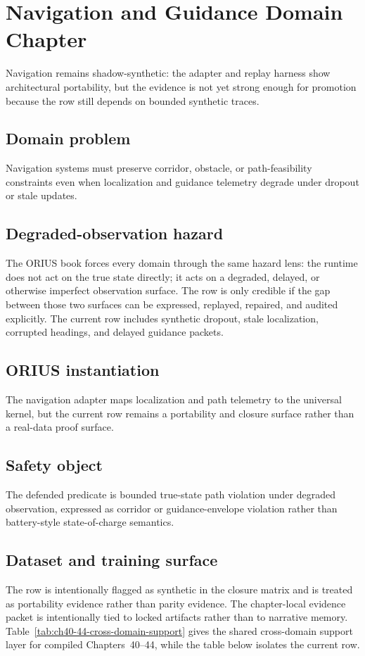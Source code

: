 \chapter{Navigation and Guidance Domain Chapter}
\label{ch:domain-navigation}

Navigation remains shadow-synthetic: the adapter and replay harness show architectural portability, but the evidence is not yet strong enough for promotion because the row still depends on bounded synthetic traces.

\section{{Domain problem}}
Navigation systems must preserve corridor, obstacle, or path-feasibility constraints even when localization and guidance telemetry degrade under dropout or stale updates.

\section{{Degraded-observation hazard}}
The ORIUS book forces every domain through the same hazard lens: the runtime does not act
on the true state directly; it acts on a degraded, delayed, or otherwise imperfect
observation surface.  The row is only credible if the gap between those two surfaces can
be expressed, replayed, repaired, and audited explicitly.
The current row includes synthetic dropout, stale localization, corrupted headings, and delayed guidance packets.

\section{{ORIUS instantiation}}
The navigation adapter maps localization and path telemetry to the universal kernel, but the current row remains a portability and closure surface rather than a real-data proof surface.

\section{{Safety object}}
The defended predicate is bounded true-state path violation under degraded observation, expressed as corridor or guidance-envelope violation rather than battery-style state-of-charge semantics.

\section{{Dataset and training surface}}
The row is intentionally flagged as synthetic in the closure matrix and is treated as portability evidence rather than parity evidence.
The chapter-local evidence packet is intentionally tied to locked artifacts rather than to
narrative memory.  Table~\ref{tab:ch40-44-cross-domain-support} gives the shared cross-domain
support layer for compiled Chapters~40--44, while the table below isolates the current row.

